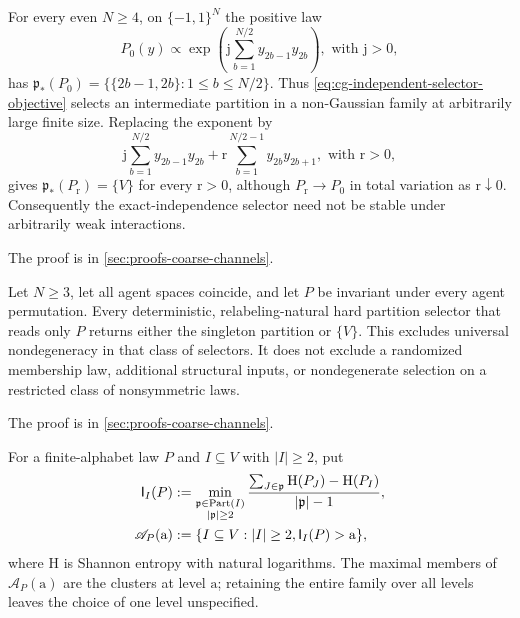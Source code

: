 For every even $N\geq4$, on $\{-1,1\}^N$ the positive law
\begin{equation}
P_0(y)\propto\exp\left(\mathrm j\sum_{b=1}^{N/2}y_{2b-1}y_{2b}\right),
\text{ with }\mathrm j>0,
\label{eq:cg-independent-pair-law}
\end{equation}
has $\mathfrak p_*(P_0)=\{\{2b-1,2b\}:1\leq b\leq N/2\}$. Thus
\eqref{eq:cg-independent-selector-objective} selects an intermediate partition in a
non-Gaussian family at arbitrarily large finite size. Replacing the exponent by
\begin{equation}
\mathrm j\sum_{b=1}^{N/2}y_{2b-1}y_{2b}
+\mathrm r\sum_{b=1}^{N/2-1}y_{2b}y_{2b+1},
\text{ with }\mathrm r>0,
\label{eq:cg-independent-pair-perturbation}
\end{equation}
gives $\mathfrak p_*(P_{\mathrm r})=\{V\}$ for every $\mathrm r>0$, although
$P_{\mathrm r}\to P_0$ in total variation as $\mathrm r\downarrow0$. Consequently
the exact-independence selector need not be stable under arbitrarily weak interactions.

The proof is in \cref{sec:proofs-coarse-channels}.

Let $N\geq3$, let all agent spaces coincide, and let $P$ be invariant under every
agent permutation. Every deterministic, relabeling-natural hard partition selector
that reads only $P$ returns either the singleton partition or $\{V\}$. This excludes
universal nondegeneracy in that class of selectors. It does not exclude a randomized
membership law, additional structural inputs, or nondegenerate selection on a restricted
class of nonsymmetric laws. 

The proof is in \cref{sec:proofs-coarse-channels}.

For a finite-alphabet law $P$ and $I\subseteq V$ with $|I|\geq2$, put
\begin{align}
\mathsf I_I(P)&:=\min_{\substack{\mathfrak p\in\operatorname{Part}(I)\\|\mathfrak p|\geq2}}
\frac{\sum_{J\in\mathfrak p}\mathrm H(P_J)-\mathrm H(P_I)}{|\mathfrak p|-1},\notag\\
\mathscr A_P(\mathrm a)&:=\{I\subseteq V:|I|\geq2,\mathsf I_I(P)>\mathrm a\},
\label{eq:cg-partition-information}
\end{align}
where $\mathrm H$ is Shannon entropy with natural logarithms. The maximal members of
$\mathscr A_P(\mathrm a)$ are the clusters at level $\mathrm a$; retaining the entire
family over all levels leaves the choice of one level unspecified.

